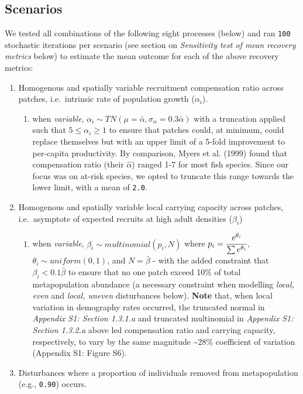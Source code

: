 \documentclass[
]{article}
\providecommand{\tightlist}{%
  \setlength{\itemsep}{0pt}\setlength{\parskip}{0pt}}
\begin{document}
\hypertarget{scenarios}{%
\subsection{Scenarios}\label{scenarios}}

We tested all combinations of the following eight processes (below) and
ran \texttt{100} stochastic iterations per scenario (see section on
\emph{Sensitivity test of mean recovery metrics} below) to estimate the
mean outcome for each of the above recovery metrics:

\begin{enumerate}
\def\labelenumi{\arabic{enumi}.}
\item
  Homogenous and spatially variable recruitment compensation ratio
  across patches, i.e.~intrinsic rate of population growth
  (\(\alpha_i\)).

  \begin{enumerate}
  \def\labelenumii{\alph{enumii}.}
  \tightlist
  \item
    when \emph{variable},
    \(\alpha_i \sim TN(\mu=\bar{\alpha}, \sigma_{\alpha}=0.3\bar{\alpha})\)
    with a truncation applied such that \(5 \leq \alpha_i \geq 1\) to
    ensure that patches could, at minimum, could replace themselves but
    with an upper limit of a 5-fold improvement to per-capita
    productivity. By comparison, Myers et al. (1999) found that
    compensation ratio (their \(\hat\alpha\)) ranged 1-7 for most fish
    species. Since our focus was on at-risk species, we opted to
    truncate this range towards the lower limit, with a mean of
    \texttt{2.0}.
  \end{enumerate}
\item
  Homogenous and spatially variable local carrying capacity across
  patches, i.e.~asymptote of expected recruits at high adult densities
  (\(\beta_i\))

  \begin{enumerate}
  \def\labelenumii{\alph{enumii}.}
  \tightlist
  \item
    when \emph{variable}, \(\beta_i \sim multinomial(p_i,N)\) where
    \(p_i=\cfrac{e^{\theta_i}}{ \sum{e^{\theta_i}}}\),
    \(\theta_i \sim uniform(0,1)\), and \(N=\bar{\beta}\) - with the
    added constraint that \(\beta_i<0.1\bar{\beta}\) to ensure that no
    one patch exceed 10\% of total metapopulation abundance (a necessary
    constraint when modelling \emph{local, even} and \emph{local,
    uneven} disturbances below). \textbf{Note} that, when local
    variation in demography rates occurred, the truncated normal in
    \emph{Appendix S1: Section 1.3.1.a} and truncated multinomial in
    \emph{Appendix S1: Section 1.3.2.a} above led compensation ratio and
    carrying capacity, respectively, to vary by the same magnitude
    \textasciitilde28\% coefficient of variation (Appendix S1: Figure
    S6).
  \end{enumerate}
\item
  Disturbances where a proportion of individuals removed from
  metapopulation (e.g., \texttt{0.90}) occurs.


\end{enumerate}
\end{document}
